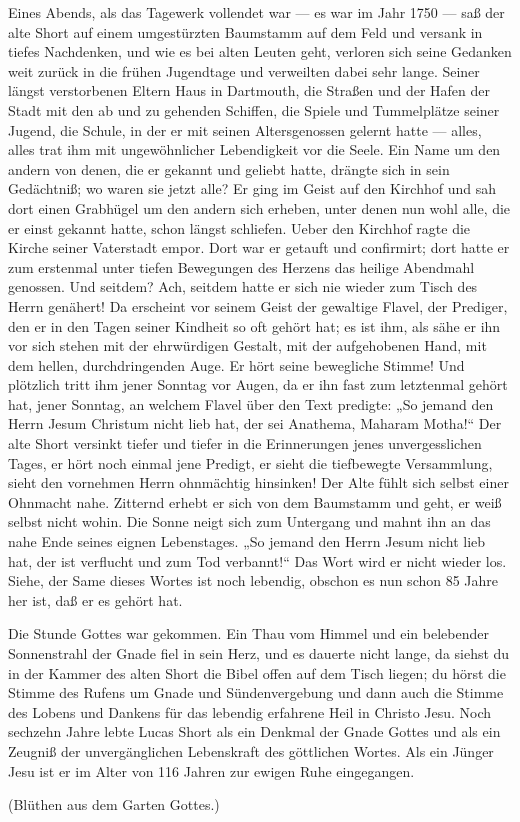 Eines Abends, als das Tagewerk vollendet war — es war im Jahr 1750 — saß der alte Short auf einem umgestürzten Baumstamm auf dem Feld und versank in tiefes Nachdenken, und wie es bei alten Leuten geht, verloren sich seine Gedanken weit zurück in die frühen Jugendtage und verweilten dabei sehr lange. Seiner längst verstorbenen Eltern Haus in Dartmouth, die Straßen und der Hafen der Stadt mit den ab und zu gehenden Schiffen, die Spiele und Tummelplätze seiner Jugend, die Schule, in der er mit seinen Altersgenossen gelernt hatte — alles, alles trat ihm mit ungewöhnlicher Lebendigkeit vor die Seele. Ein Name um den andern von denen, die er gekannt und geliebt hatte, drängte sich in sein Gedächtniß; wo waren sie jetzt alle? Er ging im Geist auf den Kirchhof und sah dort einen Grabhügel um den andern sich erheben, unter denen nun wohl alle, die er einst gekannt hatte, schon längst schliefen. Ueber den Kirchhof ragte die Kirche seiner Vaterstadt empor. Dort war er getauft und confirmirt; dort hatte er zum erstenmal unter tiefen Bewegungen des Herzens das heilige Abendmahl genossen. Und seitdem? Ach, seitdem hatte er sich nie wieder zum Tisch des Herrn genähert! Da erscheint vor seinem Geist der gewaltige Flavel, der Prediger, den er in den Tagen seiner Kindheit so oft gehört hat; es ist ihm, als sähe er ihn vor sich stehen mit der ehrwürdigen Gestalt, mit der aufgehobenen Hand, mit dem hellen, durchdringenden Auge. Er hört seine bewegliche Stimme! Und plötzlich tritt ihm jener Sonntag vor Augen, da er ihn fast zum letztenmal gehört hat, jener Sonntag, an welchem Flavel über den Text predigte: „So jemand den Herrn Jesum Christum nicht lieb hat, der sei Anathema, Maharam Motha!“ Der alte Short versinkt tiefer und tiefer in die Erinnerungen jenes unvergesslichen Tages, er hört noch einmal jene Predigt, er sieht die tiefbewegte Versammlung, sieht den vornehmen Herrn ohnmächtig hinsinken! Der Alte fühlt sich selbst einer Ohnmacht nahe. Zitternd erhebt er sich von dem Baumstamm und geht, er weiß selbst nicht wohin. Die Sonne neigt sich zum Untergang und mahnt ihn an das nahe Ende seines eignen Lebenstages. „So jemand den Herrn Jesum nicht lieb hat, der ist verflucht und zum Tod verbannt!“ Das Wort wird er nicht wieder los. Siehe, der Same dieses Wortes ist noch lebendig, obschon es nun schon 85 Jahre her ist, daß er es gehört hat.

Die Stunde Gottes war gekommen. Ein Thau vom Himmel und ein belebender Sonnenstrahl der Gnade fiel in sein Herz, und es dauerte nicht lange, da siehst du in der Kammer des alten Short die Bibel offen auf dem Tisch liegen; du hörst die Stimme des Rufens um Gnade und Sündenvergebung und dann auch die Stimme des Lobens und Dankens für das lebendig erfahrene Heil in Christo Jesu. Noch sechzehn Jahre lebte Lucas Short als ein Denkmal der Gnade Gottes und als ein Zeugniß der unvergänglichen Lebenskraft des göttlichen Wortes. Als ein Jünger Jesu ist er im Alter von 116 Jahren zur ewigen Ruhe eingegangen.

(Blüthen aus dem Garten Gottes.)
